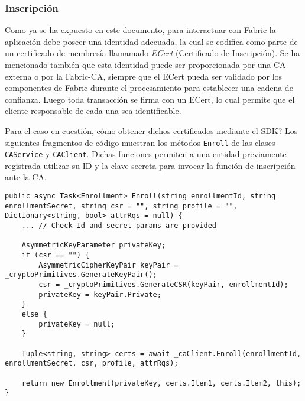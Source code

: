 \subsubsection{Inscripci\'on}

Como ya se ha expuesto en este documento, para interactuar con Fabric la aplicación debe poseer una identidad adecuada, la cual se codifica
como parte de un certificado de membresía llamamado \emph{ECert} (Certificado de Inscripción). Se ha mencionado tambi\'en que esta identidad puede
ser proporcionada por una CA externa o por la Fabric-CA, siempre que el ECert pueda ser validado por los componentes de Fabric durante el procesamiento
para establecer una cadena de confianza. Luego toda transacci\'on se firma con un ECert, lo cual permite que el cliente responsable de cada una sea identificable.

Para el caso en cuesti\'on, c\'omo obtener dichos certificados mediante el SDK? Los siguientes fragmentos de c\'odigo muestran los m\'etodos \texttt{Enroll} de las clases \texttt{CAService} y \texttt{CAClient}. Dichas funciones permiten a una entidad previamente registrada utilizar su ID y la clave secreta para invocar la funci\'on de inscripci\'on ante la CA.

\begin{lstlisting}[caption={M\'etodo \texttt{Enroll} de la clase \texttt{CAService}.}, label={code:enrollServ}]
public async Task<Enrollment> Enroll(string enrollmentId, string enrollmentSecret, string csr = "", string profile = "", Dictionary<string, bool> attrRqs = null) {
	... // Check Id and secret params are provided
	
	AsymmetricKeyParameter privateKey;
	if (csr == "") {
		AsymmetricCipherKeyPair keyPair = _cryptoPrimitives.GenerateKeyPair();
		csr = _cryptoPrimitives.GenerateCSR(keyPair, enrollmentId);
		privateKey = keyPair.Private;
	}
	else {
		privateKey = null;
	}

	Tuple<string, string> certs = await _caClient.Enroll(enrollmentId, enrollmentSecret, csr, profile, attrRqs);

	return new Enrollment(privateKey, certs.Item1, certs.Item2, this);
}
\end{lstlisting}

